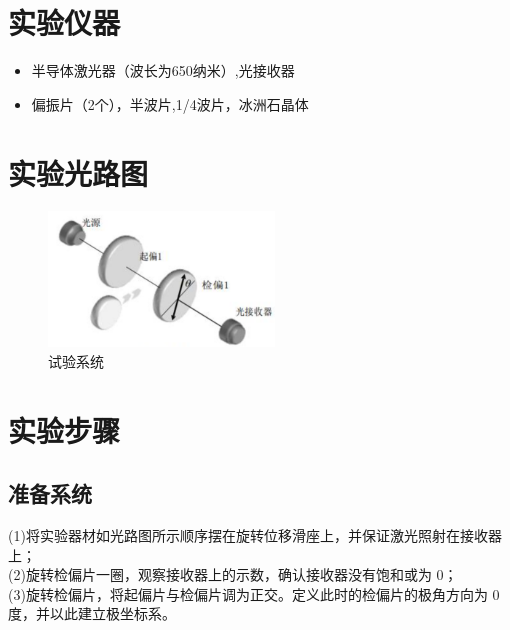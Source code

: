 \documentclass{article}
\begin{document}
\section{实验仪器}
\begin{itemize}
    \item 半导体激光器（波长为650纳米）,光接收器 
    \item 偏振片（2个），半波片,1/4波片，冰洲石晶体
\end{itemize}
\section{实验光路图}
\begin{figure}[ht]
    \centering
    \includegraphics[width=6cm]{4.1.png}
    \caption{试验系统}
\end{figure}
\section{实验步骤}
\subsection{准备系统}
(1)将实验器材如光路图所示顺序摆在旋转位移滑座上，并保证激光照射在接收器上；\\
(2)旋转检偏片一圈，观察接收器上的示数，确认接收器没有饱和或为 0；\\
(3)旋转检偏片，将起偏片与检偏片调为正交。定义此时的检偏片的极角方向为 0 度，并以此建立极坐标系。
\end{document}
